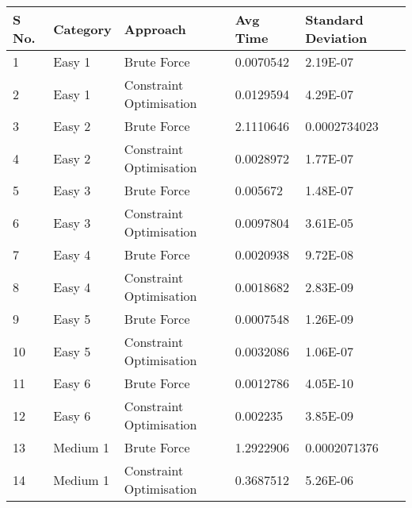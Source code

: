 \documentclass[11pt]{article}
\begin{document}
\begin{table}[!h]\centering
\begin{tabular}{|l|l|l|l|l|} 
\hline
\textbf{S No.} & \textbf{Category}           & \textbf{Approach}        & \textbf{Avg Time} & \textbf{Standard Deviation} \\ \hline
1              & Easy 1                      & Brute Force              & 0.0070542         & 2.19E-07                    \\ \hline
2              & Easy 1                      & Constraint  Optimisation & 0.0129594         & 4.29E-07                    \\ \hline
3              & Easy 2                      & Brute Force              & 2.1110646         & 0.0002734023                \\ \hline
4              & Easy 2                      & Constraint  Optimisation & 0.0028972         & 1.77E-07                    \\ \hline
5              & Easy 3                      & Brute Force              & 0.005672          & 1.48E-07                    \\ \hline
6              & Easy 3                      & Constraint  Optimisation & 0.0097804         & 3.61E-05                    \\ \hline
7              & Easy 4                      & Brute Force              & 0.0020938         & 9.72E-08                    \\ \hline
8              & Easy 4                      & Constraint  Optimisation & 0.0018682         & 2.83E-09                    \\ \hline
9              & Easy 5                      & Brute Force              & 0.0007548         & 1.26E-09                    \\ \hline
10             & Easy 5                      & Constraint  Optimisation & 0.0032086         & 1.06E-07                    \\ \hline
11             & Easy 6                      & Brute Force              & 0.0012786         & 4.05E-10                    \\ \hline
12             & Easy 6                      & Constraint  Optimisation & 0.002235          & 3.85E-09                    \\ \hline
13             & Medium 1                    & Brute Force              & 1.2922906         & 0.0002071376                \\ \hline
14             & Medium 1                    & Constraint  Optimisation & 0.3687512         & 5.26E-06                    \\ \hline

\end{tabular}
\end{table}
\end{document}
